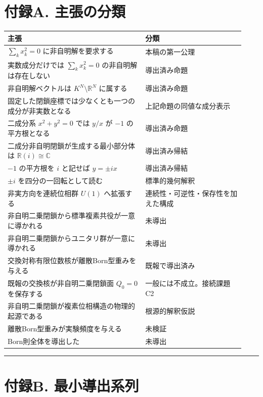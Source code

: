 \documentclass[
  a4paper,
  10pt]{article}
\newcounter{none} %
\begin{document}
\section{付録A.
主張の分類}\label{ux4ed8ux9332a-ux4e3bux5f35ux306eux5206ux985e}

{\def\LTcaptype{none} %
\small
\begin{longtable}[]{@{}p{0.54\linewidth}p{0.39\linewidth}@{}}
\toprule\noalign{}
主張 & 分類 \\
\midrule\noalign{}
\endhead
\bottomrule\noalign{}
\endlastfoot
\(\sum_kx_k^2=0\) に非自明解を要求する & 本稿の第一公理 \\
実数成分だけでは \(\sum_kx_k^2=0\) の非自明解は存在しない &
導出済み命題 \\
非自明解ベクトルは \(K^N\setminus\mathbb R^N\) に属する &
導出済み命題 \\
固定した閉鎖座標では少なくとも一つの成分が非実数となる &
上記命題の同値な成分表示 \\
二成分系 \(x^2+y^2=0\) では \(y/x\) が \(-1\) の平方根となる &
導出済み命題 \\
二成分非自明閉鎖が生成する最小部分体は \(\mathbb R(i)\cong\mathbb C\) &
導出済み帰結 \\
\(-1\) の平方根を \(i\) と記せば \(y=\pm ix\) & 導出済み帰結 \\
\(\pm i\) を四分の一回転として読む & 標準的幾何解釈 \\
非実方向を連続位相群 \(U(1)\) へ拡張する &
連続性・可逆性・保存性を加えた構成 \\
非自明二乗閉鎖から標準複素共役が一意に導かれる & 未導出 \\
非自明二乗閉鎖からユニタリ群が一意に導かれる & 未導出 \\
交換対称有限位数核が離散Born型重みを与える & 既報で導出済み \\
既報の交換核が非自明二乗閉鎖面 \(Q_0=0\) を保存する &
一般には不成立。接続課題C2 \\
非自明二乗閉鎖が複素位相構造の物理的起源である & 根源的解釈仮説 \\
離散Born型重みが実験頻度を与える & 未検証 \\
Born則全体を導出した & 未導出 \\
\end{longtable}
}

\begin{center}\rule{0.5\linewidth}{0.5pt}\end{center}

\section{付録B.
最小導出系列}\label{ux4ed8ux9332b-ux6700ux5c0fux5c0eux51faux7cfbux5217}
\end{document}
